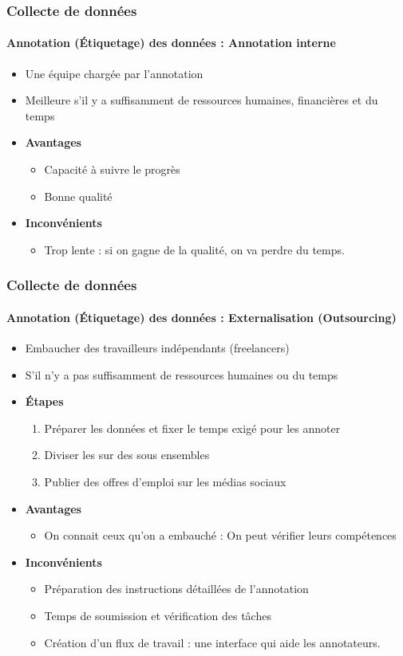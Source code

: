 \documentclass[xcolor=table]{beamer}
\begin{document}
\begin{frame}
\frametitle{Collecte de données}
\framesubtitle{Annotation (Étiquetage) des données : Annotation interne}

\begin{itemize}
	\item Une équipe chargée par l'annotation
	\item Meilleure s'il y a suffisamment de ressources humaines, financières et du temps
	\item \textbf{Avantages} 
	\begin{itemize}
		\item Capacité à suivre le progrès
		\item Bonne qualité
	\end{itemize}
	\item \textbf{Inconvénients}
	\begin{itemize}
		\item Trop lente : si on gagne de la qualité, on va perdre du temps.
	\end{itemize}
\end{itemize}

\end{frame}

\begin{frame}
\frametitle{Collecte de données}
\framesubtitle{Annotation (Étiquetage) des données : Externalisation (Outsourcing)}

\begin{itemize}
	\item Embaucher des travailleurs indépendants (freelancers)
	\item S'il n'y a pas suffisamment de ressources humaines ou du temps
	\item \textbf{Étapes}
	\begin{enumerate}
		\item Préparer les données et fixer le temps exigé pour les annoter
		\item Diviser les sur des sous ensembles
		\item Publier des offres d'emploi sur les médias sociaux
	\end{enumerate}
	\item \textbf{Avantages} 
	\begin{itemize}
		\item On connait ceux qu'on a embauché : On peut vérifier leurs compétences
	\end{itemize}
	\item \textbf{Inconvénients}
	\begin{itemize}
		\item Préparation des instructions détaillées de l'annotation
		\item Temps de soumission et vérification des tâches
		\item Création d'un flux de travail : une interface qui aide les annotateurs.
	\end{itemize}
\end{itemize}

\end{frame}
\end{document}
